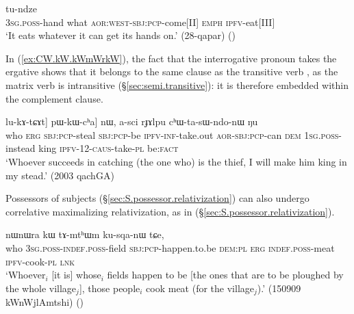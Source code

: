 \begin{exe}
\ex \label{ex:tChi.nWkWGe}
 tu-ndze \\
\textsc{3sg}.\textsc{poss}-hand what \textsc{aor}:\textsc{west}-\textsc{sbj}:\textsc{pcp}-come[II] \textsc{emph} \textsc{ipfv}-eat[III] \\
\glt `It eats whatever it can get its hands on.' (28-qapar)
()
\end{exe}


 In (\ref{ex:CW.kW.kWmWrkW}), the fact that the interrogative pronoun  takes the ergative shows that it belongs to the same clause as the transitive verb , as the matrix verb  is intransitive (§\ref{sec:semi.transitive}): it is therefore embedded within the complement clause.

\begin{exe}
\ex \label{ex:CW.kW.kWmWrkW}
\gll  [[\textbf{ɕɯ} kɯ [kɯ-mɯrkɯ kɯ-ŋu] lu-kɤ-tɕɤt] pɯ-kɯ-cʰa] nɯ, a-sci rɟɤlpu cʰɯ-ta-sɯ-ndo-nɯ ŋu \\
who \textsc{erg} \textsc{sbj}:\textsc{pcp}-steal  \textsc{sbj}:\textsc{pcp}-be \textsc{ipfv}-\textsc{inf}-take.out \textsc{aor}-\textsc{sbj}:\textsc{pcp}-can \textsc{dem} \textsc{1sg}.\textsc{poss}-instead king \textsc{ipfv}-1\fl{}2-\textsc{caus}-take-\textsc{pl} be:\textsc{fact} \\
\glt `Whoever succeeds in catching (the one who) is the thief, I will make him king in my stead.' (2003 qachGA)
\end{exe}

Possessors of subjects (§\ref{sec:S.possessor.relativization}) can also undergo correlative maximalizing relativization, as in (§\ref{sec:S.possessor.relativization}).

\begin{exe}
\ex \label{ex:WtWji.kWnAtWG}
 nɯnɯra kɯ tɤ-mtʰɯm ku-sqa-nɯ tɕe, \\
who \textsc{3sg}.\textsc{poss}-\textsc{indef}.\textsc{poss}-field \textsc{sbj}:\textsc{pcp}-happen.to.be \textsc{dem}:\textsc{pl} \textsc{erg} \textsc{indef}.\textsc{poss}-meat \textsc{ipfv}-cook-\textsc{pl} \textsc{lnk} \\
\glt `Whoever$_i$ [it is] whose$_i$ fields happen to be [the ones that are to be ploughed by the whole village$_j$], those people$_i$ cook meat (for the village$_j$).' (150909 kWnWjlAmtshi)
()
\end{exe}

